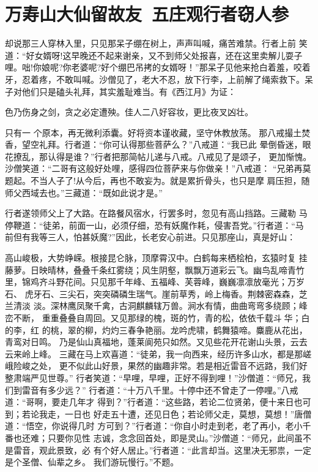 \chapter{万寿山大仙留故友~五庄观行者窃人参}

却说那三人穿林入里，只见那呆子绷在树上，声声叫喊，痛苦难禁。行者上前
笑道：“好女婿呀!这早晚还不起来谢亲，又不到师父处报喜，还在这里卖解儿耍子
哩。咄!你娘呢?你老婆呢?好个绷巴吊拷的女婿呀！”那呆子见他来抢白着羞，咬着
牙，忍着疼，不敢叫喊。沙僧见了，老大不忍，放下行李，上前解了绳索救下。呆
子对他们只是磕头礼拜，其实羞耻难当。有《西江月》为证：

色乃伤身之剑，贪之必定遭殃。佳人二八好容妆，更比夜叉凶壮。

只有一
个原本，再无微利添囊。好将资本谨收藏，坚守休教放荡。
那八戒撮土焚香，望空礼拜。行者道：“你可认得那些菩萨么？”八戒道：“我已此
晕倒昏迷，眼花撩乱，那认得是谁？”行者把那简帖儿递与八戒。八戒见了是颂子，
更加惭愧。沙僧笑道：“二哥有这般好处哩，感得四位菩萨来与你做亲！”八戒道：
“兄弟再莫题起。不当人子了!从今后，再也不敢妄为。就是累折骨头，也只是摩
肩压担，随师父西域去也。”三藏道：“既如此说才是。”

行者遂领师父上了大路。在路餐风宿水，行罢多时，忽见有高山挡路。三藏勒
马停鞭道：“徒弟，前面一山，必须仔细，恐有妖魔作耗，侵害吾党。”行者道：“马
前但有我等三人，怕甚妖魔?”因此，长老安心前进。只见那座山，真是好山：

高山峻极，大势峥嵘。根接昆仑脉，顶摩霄汉中。白鹤每来栖桧柏，玄猿时复
挂藤萝。日映晴林，叠叠千条红雾绕；风生阴壑，飘飘万道彩云飞。幽鸟乱啼青竹
里，锦鸡齐斗野花间。只见那千年峰、五福峰、芙蓉峰，巍巍凛凛放毫光；万岁石、
虎牙石、三尖石，突突磷磷生瑞气。崖前草秀，岭上梅香。荆棘密森森，芝兰清淡
淡。深林鹰凤聚千禽，古洞麒麟辖万兽。涧水有情，曲曲弯弯多绕顾；峰峦不断，
重重叠叠自周回。又见那绿的槐，斑的竹，青的松，依依千载斗华；白的李，红
的桃，翠的柳，灼灼三春争艳丽。龙吟虎啸，鹤舞猿啼。麋鹿从花出，青鸾对日鸣。
乃是仙山真福地，蓬莱阆苑只如然。又见些花开花谢山头景，云去云来岭上峰。
三藏在马上欢喜道：“徒弟，我一向西来，经历许多山水，都是那嵯峨险峻之处，
更不似此山好景，果然的幽趣非常。若是相近雷音不远路，我们好整肃端严见世尊。”
行者笑道：“早哩，早哩，正好不得到哩！”沙僧道：“师兄，我们到雷音有多少远？”
行者道：“十万八千里。十停中还不曾走了一停哩。”八戒道：“哥啊，要走几年才
得到？”行者道：“这些路，若论二位贤弟，便十来日也可到；若论我走，一日也
好走五十遭，还见日色；若论师父走，莫想，莫想！”唐僧道：“悟空，你说得几时
方可到？”行者道：“你自小时走到老，老了再小，老小千番也还难；只要你见性
志诚，念念回首处，即是灵山。”沙僧道：“师兄，此间虽不是雷音，观此景致，必
有个好人居止。”行者道：“此言却当。这里决无邪祟，一定是个圣僧、仙辈之乡。
我们游玩慢行。”不题。

